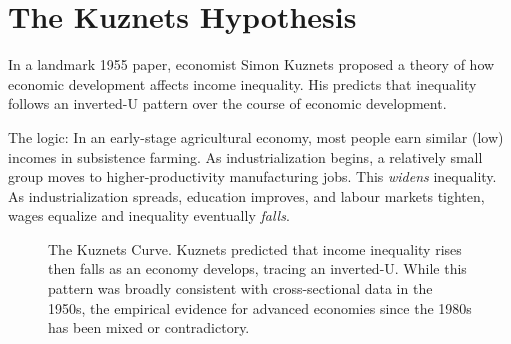 \section{The Kuznets Hypothesis}

In a landmark 1955 paper, economist Simon Kuznets proposed a theory of how economic development affects income inequality. His  predicts that inequality follows an inverted-U pattern over the course of economic development.

The logic: In an early-stage agricultural economy, most people earn similar (low) incomes in subsistence farming. As industrialization begins, a relatively small group moves to higher-productivity manufacturing jobs. This \textit{widens} inequality. As industrialization spreads, education improves, and labour markets tighten, wages equalize and inequality eventually \textit{falls}.

\begin{figure}[H]
\centering
{}
\caption{The Kuznets Curve. Kuznets predicted that income inequality rises then falls
  as an economy develops, tracing an inverted-U. While this pattern was broadly
  consistent with cross-sectional data in the 1950s, the empirical evidence for
  advanced economies since the 1980s has been mixed or contradictory.}
\label{fig:kuznets}
\end{figure}


